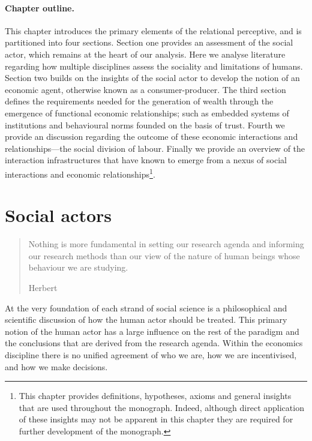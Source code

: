 \paragraph{Chapter outline.}

This chapter introduces the primary elements of the relational perceptive, and is partitioned into four sections. Section one provides an assessment of the social actor, which remains at the heart of our analysis. Here we analyse literature regarding how multiple disciplines assess the sociality and limitations of humans. Section two builds on the insights of the social actor to develop the notion of an economic agent, otherwise known as a consumer-producer. The third section defines the requirements needed for the generation of wealth through the emergence of functional economic relationships; such as embedded systems of institutions and behavioural norms founded on the basis of trust. Fourth we provide an discussion regarding the outcome of these economic interactions and relationships---the social division of labour. Finally we provide an overview of the interaction infrastructures that have known to emerge from a nexus of social interactions and economic relationships\footnote{This chapter provides definitions, hypotheses, axioms and general insights that are used throughout the monograph. Indeed, although direct application of these insights may not be apparent in this chapter they are required for further development of the monograph.}.

\section{Social actors}

\begin{quote}
Nothing is more fundamental in setting our research agenda and informing our research methods than our view of the nature of human beings whose behaviour we are studying.

\begin{flushright}
Herbert \citet[p.~303]{Simon1985}
\end{flushright}
\end{quote}

At the very foundation of each strand of social science is a philosophical and scientific discussion of how the human actor should be treated. This primary notion of the human actor has a large influence on the rest of the paradigm and the conclusions that are derived from the research agenda. Within the economics discipline there is no unified agreement of who we are, how we are incentivised, and how we make decisions. 

